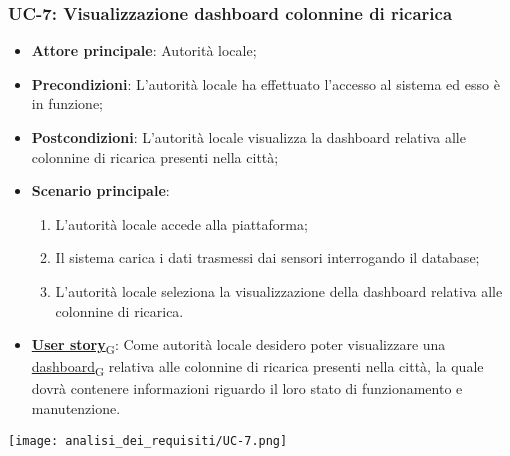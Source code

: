 \subsubsection{UC-7: Visualizzazione dashboard colonnine di ricarica}
\begin{itemize}
	\item \textbf{Attore principale}: Autorità locale;
	\item \textbf{Precondizioni}: L'autorità locale ha effettuato l'accesso al sistema ed esso è in funzione;
	\item \textbf{Postcondizioni}: L'autorità locale visualizza la dashboard relativa
	      alle colonnine di ricarica presenti nella città;
	\item \textbf{Scenario principale}:
	      \begin{enumerate}
		      \item L'autorità locale accede alla piattaforma;
		      \item Il sistema carica i dati trasmessi dai sensori interrogando il database;
		      \item L'autorità locale seleziona la visualizzazione della dashboard relativa alle colonnine di ricarica.
	      \end{enumerate}
	\item \href{https://7last.github.io/docs/rtb/documentazione-interna/glossario\#user-story}{\textbf{User story}\textsubscript{G}}:
	      Come autorità locale desidero poter visualizzare una \href{https://7last.github.io/docs/rtb/documentazione-interna/glossario\#dashboard}{dashboard\textsubscript{G}} relativa alle colonnine di ricarica presenti nella città, la quale
	      dovrà contenere informazioni riguardo il loro stato di funzionamento e manutenzione.
\end{itemize}
\begin{center}
	\texttt{[image: analisi\_dei\_requisiti/UC-7.png]}
\end{center}

